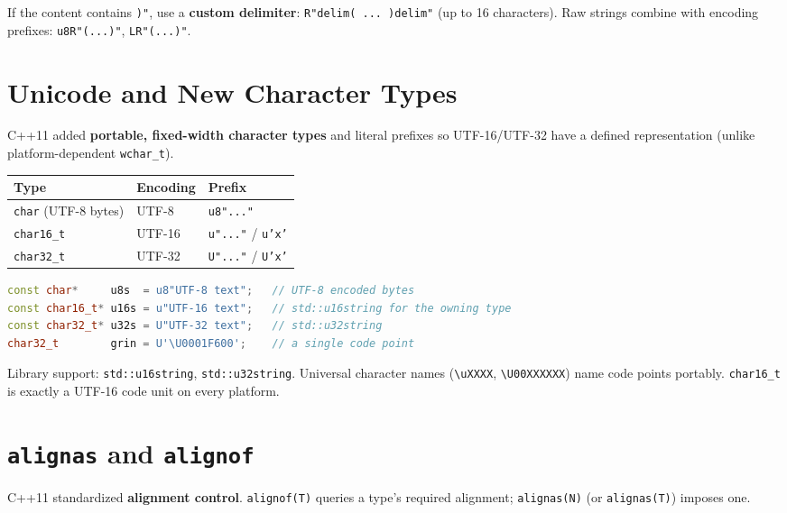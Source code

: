 If the content contains \texttt{)"}, use a \textbf{custom delimiter}: \texttt{R"delim( ... )delim"} (up to 16 characters). Raw strings combine with encoding prefixes: \texttt{u8R"(...)"}, \texttt{LR"(...)"}.

\section{Unicode and New Character Types}

C++11 added \textbf{portable, fixed-width character types} and literal prefixes so UTF-16/UTF-32 have a defined representation (unlike platform-dependent \texttt{wchar\_t}).

\begin{center}
\begin{tabular}{|l|l|l|}
\hline \textbf{Type} & \textbf{Encoding} & \textbf{Prefix} \\ \hline
\texttt{char} (UTF-8 bytes) & UTF-8  & \texttt{u8"..."} \\
\texttt{char16\_t}          & UTF-16 & \texttt{u"..."} / \texttt{u'x'} \\
\texttt{char32\_t}          & UTF-32 & \texttt{U"..."} / \texttt{U'x'} \\
\hline
\end{tabular}
\end{center}

\begin{lstlisting}[language=C++, caption={the new character types and literals}]
const char*     u8s  = u8"UTF-8 text";   // UTF-8 encoded bytes
const char16_t* u16s = u"UTF-16 text";   // std::u16string for the owning type
const char32_t* u32s = U"UTF-32 text";   // std::u32string
char32_t        grin = U'\U0001F600';    // a single code point
\end{lstlisting}

Library support: \texttt{std::u16string}, \texttt{std::u32string}. Universal character names (\texttt{\textbackslash uXXXX}, \texttt{\textbackslash U00XXXXXX}) name code points portably. \texttt{char16\_t} is exactly a UTF-16 code unit on every platform.

\section{\texttt{alignas} and \texttt{alignof}}

C++11 standardized \textbf{alignment control}. \texttt{alignof(T)} queries a type's required alignment; \texttt{alignas(N)} (or \texttt{alignas(T)}) imposes one.

